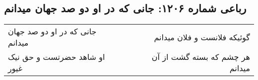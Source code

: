 \begin{center}
\section*{رباعی شماره ۱۲۰۶: جانی که در او دو صد جهان میدانم}
\label{sec:1206}
\begin{longtable}{l p{0.5cm} r}
جانی که در او دو صد جهان میدانم
&&
گوئیکه فلانست و فلان میدانم
\\
او شاهد حضرتست و حق نیک غیور
&&
هر چشم که بسته گشت از آن میدانم
\\
\end{longtable}
\end{center}
